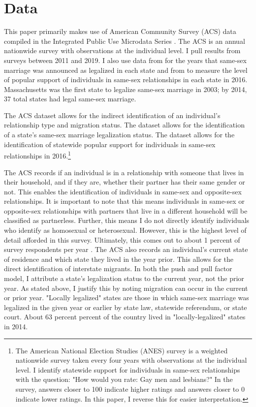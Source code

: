 \documentclass[12pt,letterpaper]{article}
\begin{document}
\section{Data}

This paper primarily makes use of American Community Survey (ACS) data compiled in the Integrated Public Use Microdata Series \citep{28}. The ACS is an annual nationwide survey with observations at the individual level. I pull results from surveys between 2011 and 2019. I also use data from \citet{27} for the years that same-sex marriage was announced as legalized in each state and from \citet{29} to measure the level of popular support of individuals in same-sex relationships in each state in 2016. Massachusetts was the first state to legalize same-sex marriage in 2003; by 2014, 37 total states had legal same-sex marriage.



The ACS dataset allows for the indirect identification of an individual’s relationship type and migration status. The \citet{27} dataset allows for the identification of a state’s same-sex marriage legalization status. The \citet{29} dataset allows for the identification of statewide popular support for individuals in same-sex relationships in 2016.\footnote{The American National Election Studies (ANES) survey is a weighted nationwide survey taken every four years with observations at the individual level. I identify statewide support for individuals in same-sex relationships with the question: "How would you rate: Gay men and lesbians?" In the survey, answers closer to 100 indicate higher ratings and answers closer to 0 indicate lower ratings. In this paper, I reverse this for easier interpretation.}

The ACS records if an individual is in a relationship with someone that lives in their household, and if they are, whether their partner has their same gender or not. This enables the identification of individuals in same-sex and opposite-sex relationships. It is important to note that this means individuals in same-sex or opposite-sex relationships with partners that live in a different household will be classified as partnerless. Further, this means I do not directly identify individuals who identify as homosexual or heterosexual. However, this is the highest level of detail afforded in this survey. Ultimately, this comes out to about 1 percent of survey respondents per year \citep{28}. The ACS also records an individual’s current state of residence and which state they lived in the year prior. This allows for the direct identification of interstate migrants. In both the push and pull factor model, I attribute a state’s legalization status to the current year, not the prior year. As stated above, I justify this by noting migration can occur in the current or prior year. "Locally legalized" states are those in which same-sex marriage was legalized in the given year or earlier by state law, statewide referendum, or state court. About 63 percent percent of the country lived in "locally-legalized" states in 2014. 
\end{document}
